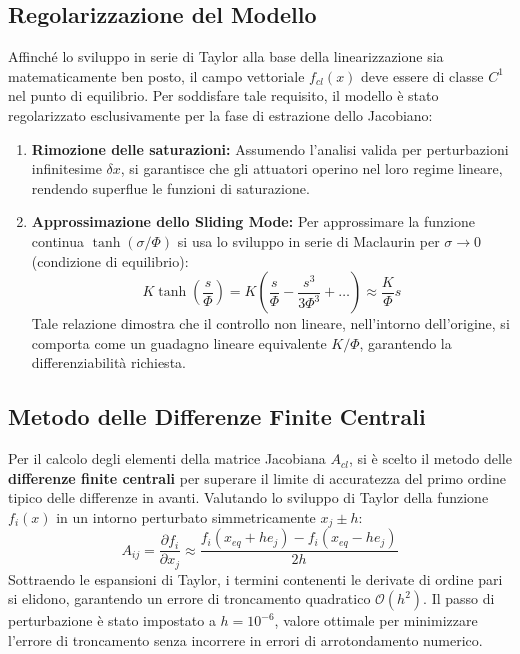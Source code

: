 \subsection{Regolarizzazione del Modello}
Affinché lo sviluppo in serie di Taylor alla base della linearizzazione sia matematicamente ben posto, il campo vettoriale $f_{cl}(x)$ deve essere di classe $C^1$ nel punto di equilibrio. Per soddisfare tale requisito, il modello è stato regolarizzato esclusivamente per la fase di estrazione dello Jacobiano:
\begin{enumerate}
    \item \textbf{Rimozione delle saturazioni:} Assumendo l'analisi valida per perturbazioni infinitesime $\delta x$, si garantisce che gli attuatori operino nel loro regime lineare, rendendo superflue le funzioni di saturazione.
    \item \textbf{Approssimazione dello Sliding Mode:} Per approssimare la funzione continua $\tanh(\sigma/\Phi)$ si usa lo sviluppo in serie di Maclaurin per $\sigma \to 0$ (condizione di equilibrio):
    \begin{equation}
        K \tanh\left(\frac{s}{\Phi}\right) = K \left( \frac{s}{\Phi} - \frac{s^3}{3\Phi^3} + \dots \right) \approx \frac{K}{\Phi}s
    \end{equation}
    Tale relazione dimostra che il controllo non lineare, nell'intorno dell'origine, si comporta come un guadagno lineare equivalente $K/\Phi$, garantendo la differenziabilità richiesta.
\end{enumerate}

\subsection{Metodo delle Differenze Finite Centrali}
Per il calcolo degli elementi della matrice Jacobiana $A_{cl}$, si è scelto il metodo delle \textbf{differenze finite centrali} per superare il limite di accuratezza del primo ordine tipico delle differenze in avanti.
Valutando lo sviluppo di Taylor della funzione $f_i(x)$ in un intorno perturbato simmetricamente $x_j \pm h$:
\begin{equation}
    A_{ij} = \frac{\partial f_i}{\partial x_j} \approx \frac{f_i(x_{eq} + h e_j) - f_i(x_{eq} - h e_j)}{2h}
\end{equation}
Sottraendo le espansioni di Taylor, i termini contenenti le derivate di ordine pari si elidono, garantendo un errore di troncamento quadratico $\mathcal{O}(h^2)$. Il passo di perturbazione è stato impostato a $h = 10^{-6}$, valore ottimale per minimizzare l'errore di troncamento senza incorrere in errori di arrotondamento numerico.

